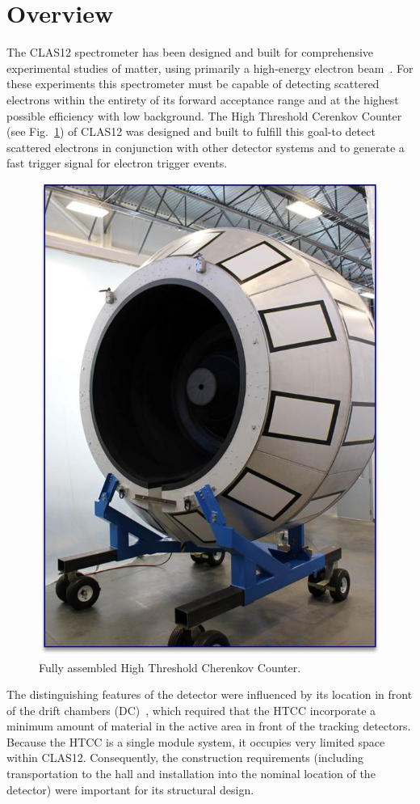 \section{Overview}

The CLAS12 spectrometer has been designed and built for comprehensive experimental studies of matter,
using primarily a high-energy electron beam~\cite{clas12-nim}. For these experiments this spectrometer
must be capable of detecting scattered electrons within the entirety of its forward acceptance range
and at the highest possible efficiency with low background. The High Threshold Cerenkov Counter (see
Fig.~\ref{fig:Picture1}) of CLAS12 was designed and built to fulfill this goal-to detect scattered electrons in conjunction with
other detector systems and to generate a fast trigger signal for electron trigger events. 

\begin{figure}[ht]
    \centering
    \includegraphics[width=0.75\linewidth]{images/Picture1.jpg}
    \caption{Fully assembled High Threshold Cherenkov Counter.}
    \label{fig:Picture1}
\end{figure}
The distinguishing features of the detector were influenced by its location in front of the drift chambers
(DC)~\cite{dc-nim}, which required that the HTCC incorporate a minimum amount of material in the active
area in front of the tracking detectors. Because the HTCC is a single module system, it occupies very limited
space within CLAS12. Consequently, the construction requirements (including transportation to the hall and
installation into the nominal location of the detector) were important for its structural design. 
